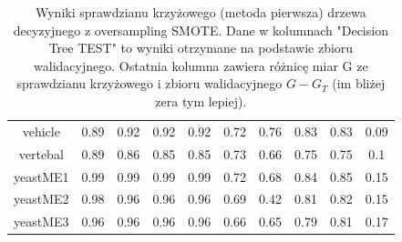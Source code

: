 \begin{table}[H]
\begin{center}
{\begin{tabular}{|c|c|c|c|c|c|c|c|c|c|}
				vehicle&0.89&0.92&0.92&0.92&0.72&0.76&0.83&0.83&0.09\\%
				vertebal&0.89&0.86&0.85&0.85&0.73&0.66&0.75&0.75&0.1\\%
				yeastME1&0.99&0.99&0.99&0.99&0.72&0.68&0.84&0.85&0.15\\%
				yeastME2&0.98&0.96&0.96&0.96&0.69&0.42&0.81&0.82&0.15\\%
				yeastME3&0.96&0.96&0.96&0.96&0.66&0.65&0.79&0.81&0.17\\%
				\hline%
			\end{tabular}}%
			\caption{Wyniki sprawdzianu krzyżowego (metoda pierwsza) drzewa decyzyjnego z oversampling SMOTE. Dane w kolumnach "Decision Tree TEST" to wyniki otrzymane na podstawie zbioru walidacyjnego. Ostatnia kolumna zawiera różnicę  miar G ze sprawdzianu krzyżowego i zbioru walidacyjnego $G-G_T$ (im bliżej zera tym lepiej).}
			\label{CVoversampling1}
		\end{center}
\end{table}



